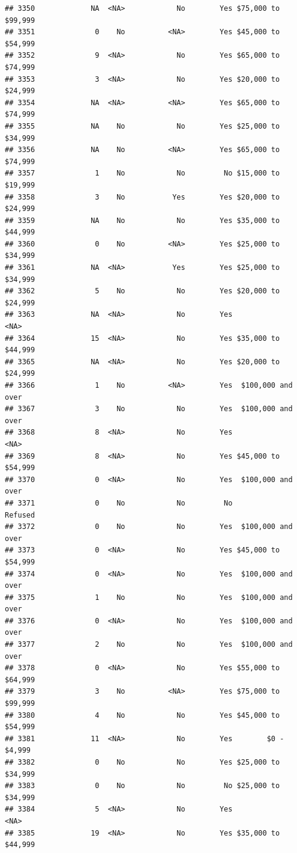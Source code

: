 \documentclass[man]{apa6}
\begin{document}
\begin{verbatim}
## 3350             NA  <NA>            No        Yes $75,000 to $99,999
## 3351              0    No          <NA>        Yes $45,000 to $54,999
## 3352              9  <NA>            No        Yes $65,000 to $74,999
## 3353              3  <NA>            No        Yes $20,000 to $24,999
## 3354             NA  <NA>          <NA>        Yes $65,000 to $74,999
## 3355             NA    No            No        Yes $25,000 to $34,999
## 3356             NA    No          <NA>        Yes $65,000 to $74,999
## 3357              1    No            No         No $15,000 to $19,999
## 3358              3    No           Yes        Yes $20,000 to $24,999
## 3359             NA    No            No        Yes $35,000 to $44,999
## 3360              0    No          <NA>        Yes $25,000 to $34,999
## 3361             NA  <NA>           Yes        Yes $25,000 to $34,999
## 3362              5    No            No        Yes $20,000 to $24,999
## 3363             NA  <NA>            No        Yes               <NA>
## 3364             15  <NA>            No        Yes $35,000 to $44,999
## 3365             NA  <NA>            No        Yes $20,000 to $24,999
## 3366              1    No          <NA>        Yes  $100,000 and over
## 3367              3    No            No        Yes  $100,000 and over
## 3368              8  <NA>            No        Yes               <NA>
## 3369              8  <NA>            No        Yes $45,000 to $54,999
## 3370              0  <NA>            No        Yes  $100,000 and over
## 3371              0    No            No         No            Refused
## 3372              0    No            No        Yes  $100,000 and over
## 3373              0  <NA>            No        Yes $45,000 to $54,999
## 3374              0  <NA>            No        Yes  $100,000 and over
## 3375              1    No            No        Yes  $100,000 and over
## 3376              0  <NA>            No        Yes  $100,000 and over
## 3377              2    No            No        Yes  $100,000 and over
## 3378              0  <NA>            No        Yes $55,000 to $64,999
## 3379              3    No          <NA>        Yes $75,000 to $99,999
## 3380              4    No            No        Yes $45,000 to $54,999
## 3381             11  <NA>            No        Yes        $0 - $4,999
## 3382              0    No            No        Yes $25,000 to $34,999
## 3383              0    No            No         No $25,000 to $34,999
## 3384              5  <NA>            No        Yes               <NA>
## 3385             19  <NA>            No        Yes $35,000 to $44,999

\end{verbatim}
\end{document}
